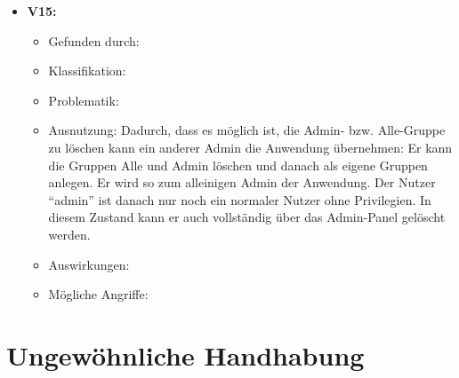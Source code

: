 \documentclass[12pt,DIV14,BCOR10mm,a4paper,parskip=half-,headsepline,headinclude,english,ngerman,bibliography=totocnumbered]{scrreprt}
\begin{document}
\begin{itemize}
  \hypertarget{vulnerability15}{}
  \item \textbf{V15: }
  \begin{itemize}
  \item Gefunden durch:
  \item Klassifikation: 
  \item Problematik:
  \item Ausnutzung: Dadurch, dass es möglich ist, die Admin- bzw. Alle-Gruppe zu löschen kann ein anderer Admin die Anwendung übernehmen: Er kann die Gruppen Alle und Admin löschen und danach als eigene Gruppen anlegen. Er wird so zum alleinigen Admin der Anwendung. Der Nutzer \enquote{admin} ist danach nur noch ein normaler Nutzer ohne Privilegien. In diesem Zustand kann er auch vollständig über das Admin-Panel gelöscht werden.
  \item Auswirkungen: 
  \item Mögliche Angriffe:
  \end{itemize}
\end{itemize}

\chapter{Ungewöhnliche Handhabung}
\end{document}

